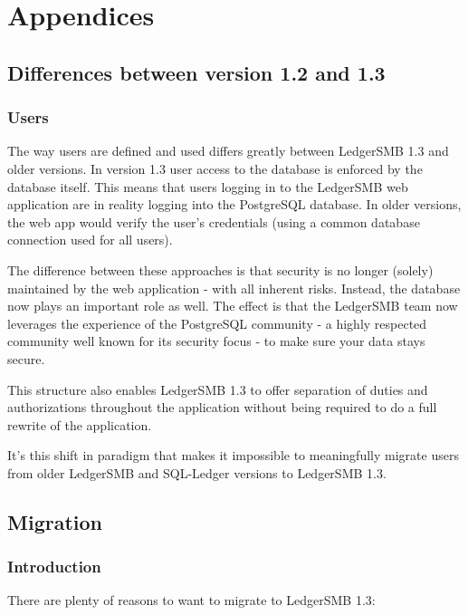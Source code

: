 


\part{Appendices}
\appendix

\chapter{Differences between version 1.2 and 1.3}

\section{Users}
\label{sec:DifferencesUsers}

The way users are defined and used differs greatly between LedgerSMB 1.3 and
older versions. In version 1.3 user access to the database is enforced by the
database itself. This means that users logging in to the LedgerSMB web application
are in reality logging into the PostgreSQL database. In older versions, the web
app would verify the user's credentials (using a common database connection used
for all users).

The difference between these approaches is that security is no longer (solely)
maintained by the web application - with all inherent risks. Instead, the database
now plays an important role as well. The effect is that the LedgerSMB team now
leverages the experience of the PostgreSQL community - a highly respected community
well known for its security focus - to make sure your data stays secure.

This structure also enables LedgerSMB 1.3 to offer separation of duties and
authorizations throughout the application without being required to do a full
rewrite of the application.

It's this shift in paradigm that makes it impossible to meaningfully migrate
users from older LedgerSMB and SQL-Ledger versions to LedgerSMB 1.3.


\chapter{Migration}

\section{Introduction}

There are plenty of reasons to want to migrate to LedgerSMB 1.3:

